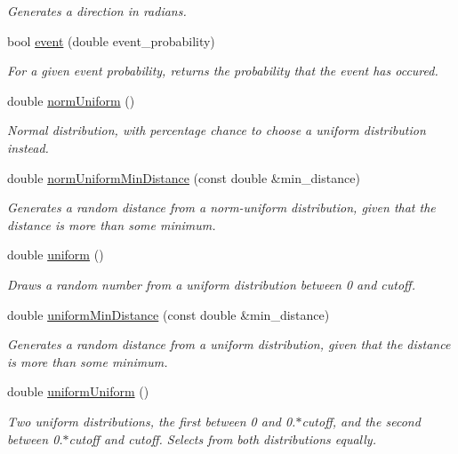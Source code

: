 \begin{DoxyCompactItemize}
\begin{DoxyCompactList}\small\item\em Generates a direction in radians. \end{DoxyCompactList}\item 
bool \hyperlink{class_n_rrand_a7c7a2dc1b3f14ebaaa0e6edd6c1d517a}{event} (double event\+\_\+probability)
\begin{DoxyCompactList}\small\item\em For a given event probability, returns the probability that the event has occured. \end{DoxyCompactList}\item 
double \hyperlink{class_n_rrand_ab18277b2f873878602e82672b272c9be}{norm\+Uniform} ()
\begin{DoxyCompactList}\small\item\em Normal distribution, with percentage chance to choose a uniform distribution instead. \end{DoxyCompactList}\item 
double \hyperlink{class_n_rrand_ad8c9f54d596e01624505c765172d8328}{norm\+Uniform\+Min\+Distance} (const double \&min\+\_\+distance)
\begin{DoxyCompactList}\small\item\em Generates a random distance from a norm-\/uniform distribution, given that the distance is more than some minimum. \end{DoxyCompactList}\item 
double \hyperlink{class_n_rrand_ac89740fa57b3f92e30ca46b3d467a480}{uniform} ()
\begin{DoxyCompactList}\small\item\em Draws a random number from a uniform distribution between 0 and cutoff. \end{DoxyCompactList}\item 
double \hyperlink{class_n_rrand_a34fb5fae8e81f5073b6ec63988338c07}{uniform\+Min\+Distance} (const double \&min\+\_\+distance)
\begin{DoxyCompactList}\small\item\em Generates a random distance from a uniform distribution, given that the distance is more than some minimum. \end{DoxyCompactList}\item 
double \hyperlink{class_n_rrand_a799f55c57dc238f094a20e882e3abb51}{uniform\+Uniform} ()
\begin{DoxyCompactList}\small\item\em Two uniform distributions, the first between 0 and 0.$\ast$cutoff, and the second between 0.$\ast$cutoff and cutoff. Selects from both distributions equally. \end{DoxyCompactList}\item 

\end{DoxyCompactItemize}
